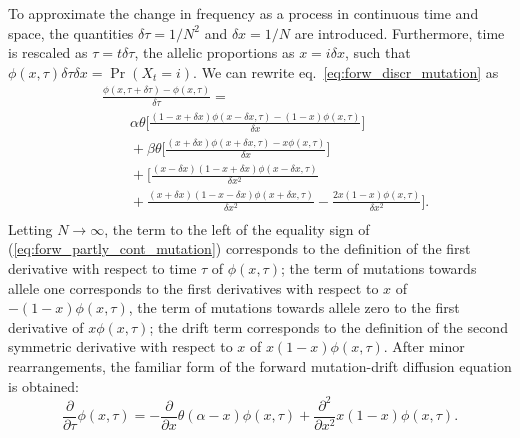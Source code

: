 \documentclass[preprint]{elsarticle}
\newcommand\x[1]{\ensuremath{X_{#1}}}
\begin{document}

To approximate the change in frequency as a process in continuous time and space, the quantities $\delta \tau=1/N^2$ and $\delta x=1/N$ are introduced. Furthermore, time is rescaled as $\tau = t\delta \tau$, the allelic proportions as $x=i\delta x$, such that $\phi(x,\tau)\delta \tau \delta x =
\Pr(\x{t}=i)$. %
We can rewrite eq.~\eqref{eq:forw_discr_mutation} as
\begin{equation}\label{eq:forw_partly_cont_mutation}
\begin{split}
&%
\frac{\phi(x,\tau+\delta \tau)-\phi(x,\tau)}{\delta \tau} =\\ 
&\qquad
\alpha\theta \bigg[\frac{(1-x+\delta x)\phi(x-\delta x, \tau) - (1-x)\phi(x,\tau)}{\delta x}\bigg]\\
&\qquad+\beta\theta \bigg[\frac{(x+\delta x)\phi(x+\delta x,\tau) - x\phi(x,\tau)}{\delta x}\bigg]\\
&\qquad+\bigg[\frac{(x-\delta x)(1-x+\delta x)\phi(x-\delta x,\tau)}{\delta x^2}\\
&\qquad+ \frac{(x+\delta x)(1-x-\delta x)\phi(x+\delta x,\tau)}{\delta x^2}-\frac{2x(1-x)\phi(x,\tau)}{\delta x^2}\bigg]
.\\
\end{split}
\end{equation}
Letting $N\to\infty$, the term to the left of the equality sign of (\ref{eq:forw_partly_cont_mutation}) corresponds to the definition of the first derivative with respect to time $\tau$ of $\phi(x,\tau)$; the term of mutations towards allele one corresponds to the first derivatives with respect to $x$ of $-(1-x)\phi(x,\tau)$, the term of mutations towards allele zero to the first derivative of $x\phi(x,\tau)$; the drift term corresponds to the definition of the second symmetric derivative with respect to $x$ of $x(1-x)\phi(x,\tau)$. After minor rearrangements, the familiar form of the forward mutation-drift diffusion equation is obtained:
\begin{equation}\label{eq:forw_mutdrift}
\frac{\partial}{\partial \tau} \phi(x,\tau) = -\frac{\partial}{\partial x}\theta(\alpha-x)\phi(x,\tau) +\frac{\partial^2}{\partial x^2}x(1-x)\phi(x,\tau).
\end{equation}
\end{document}
